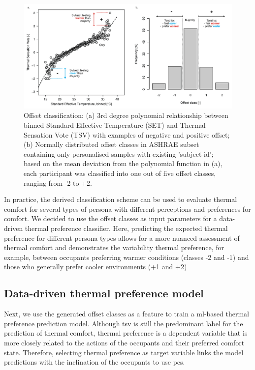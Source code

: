 \begin{figure}[!h]
    \centering
    \includegraphics[width=\textwidth]{manuscript/src/figures/offset-class.png}
    \caption{Offset classification: (a) 3rd degree polynomial relationship between binned Standard Effective Temperature (SET) and Thermal Sensation Vote (TSV) with examples of negative and positive offset; (b) Normally distributed offset classes in ASHRAE subset containing only personalised samples with existing 'subject-id'; based on the mean deviation from the polynomial function in (a), each participant was classified into one out of five offset classes, ranging from -2 to +2.}
    \label{fig:offset}
\end{figure}

In practice, the derived classification scheme can be used to evaluate thermal comfort for several types of persona with different perceptions and preferences for comfort. We decided to use the offset classes as input parameters for a data-driven thermal preference classifier. Here, predicting the expected thermal preference for different persona types allows for a more nuanced assessment of thermal comfort and demonstrates the variability thermal preference, for example, between occupants preferring warmer conditions (classes -2 and -1) and those who generally prefer cooler environments (+1 and +2)



\subsection{Data-driven thermal preference model}

Next, we use the generated offset classes as a feature to train a \gls{ml}-based thermal preference prediction model. Although \gls{tsv} is still the predominant label for the prediction of thermal comfort, thermal preference is a dependent variable that is more closely related to the actions of the occupants and their preferred comfort state. Therefore, selecting thermal preference as target variable links the model predictions with the inclination of the occupants to use \gls{pcs}.


